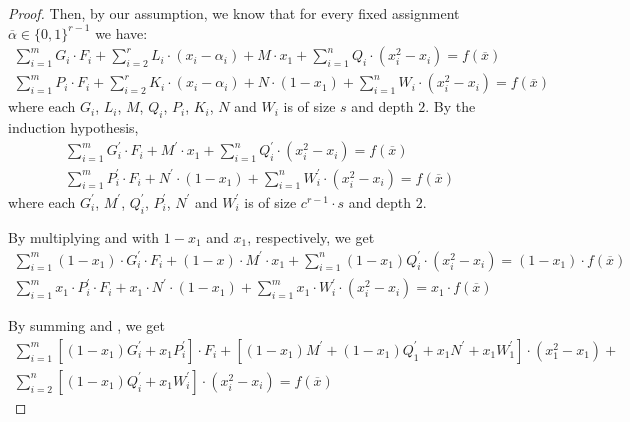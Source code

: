\documentclass[11pt,letter]{article}
\theoremstyle{remark} %
\begin{document}
{\begin{proof}
        Then, by our assumption, we know that for every fixed assignment $\overline{\alpha} \in \{0,1\}^{r-1}$ we have:
        \begin{align}
            \sum_{i=1}^m G_i \cdot F_i + \sum_{i=2}^r L_i \cdot (x_i - \alpha_i) + M \cdot x_1 + \sum_{i=1}^n Q_i \cdot (x_i^2 - x_i) = f(\overline{x})\\
            \sum_{i=1}^m P_i \cdot F_i + \sum_{i=2}^r K_i \cdot (x_i - \alpha_i) + N \cdot (1-x_1) + \sum_{i=1}^n W_i \cdot (x_i^2 - x_i) = f(\overline{x})
        \end{align}
        where each $G_i$, $L_i$, $M$, $Q_i$, $P_i$, $K_i$, $N$ and $W_i$ is of size $s$ and depth $2$.
        By the induction hypothesis,
        \begin{align}
            \sum_{i=1}^m G_i^\prime \cdot F_i + M^\prime \cdot x_1 + \sum_{i=1}^n Q_i^\prime \cdot (x_i^2 -x_i) = f(\overline{x}) \label{eq: 01 implication completeness 1}\\
            \sum_{i=1}^m P_i^\prime \cdot F_i + N^\prime \cdot (1-x_1) + \sum_{i=1}^n W_i^\prime \cdot (x_i^2 - x_i) = f(\overline{x}) \label{eq: 01 implication completeness 2}
        \end{align}
        where each $G_i^\prime$, $M^\prime$, $Q_i^\prime$, $P_i^\prime$, $N^\prime$ and $W_i^\prime$ is of size $c^{r-1} \cdot s$ and depth $2$.
        
        By multiplying  and  with $1-x_1$ and $x_1$, respectively, we get
        \begin{align}
            \sum_{i=1}^m (1-x_1)\cdot G_i^\prime \cdot F_i + (1-x) \cdot M^\prime \cdot x_1 + \sum_{i=1}^n (1-x_1) Q_i^\prime \cdot (x_i^2 -x_i) = (1-x_1)\cdot f(\overline{x}) \label{eq: 01 implication completeness 3}\\
            \sum_{i=1}^m x_1 \cdot P_i^\prime \cdot F_i + x_1 \cdot N^\prime \cdot (1-x_1) + \sum_{i=1}^m x_1\cdot W_i^\prime \cdot (x_i^2 - x_i) = x_1\cdot f(\overline{x}) \label{eq: 01 implication completeness 4}
        \end{align}

        By summing  and , we get
        \begin{align*}
            \sum_{i=1}^m [(1-x_1)  G_i^\prime + x_1  P_i^\prime] \cdot F_i + [ (1-x_1)  M^\prime + (1-x_1) Q_1^\prime + x_1 N^\prime + x_1 W_1^\prime] \cdot (x_1^2 - x_1) + \\
            \sum_{i=2}^n [(1-x_1) Q_i^\prime + x_1 W_i^\prime] \cdot (x_i^2 - x_i) = f(\overline{x})
        \end{align*}


\end{proof}}
\end{document}
